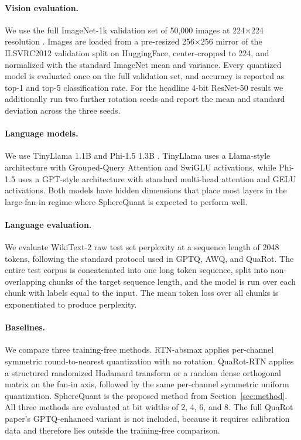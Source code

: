 \paragraph{Vision evaluation.}
We use the full ImageNet-1k validation set of 50,000 images at
224$\times$224 resolution \citep{deng2009imagenet}. Images are loaded
from a pre-resized 256$\times$256 mirror of the ILSVRC2012 validation
split on HuggingFace, center-cropped to 224, and normalized with the
standard ImageNet mean and variance. Every quantized model is evaluated
once on the full validation set, and accuracy is reported as top-1 and
top-5 classification rate. For the headline 4-bit ResNet-50 result we
additionally run two further rotation seeds and report the mean and
standard deviation across the three seeds.

\paragraph{Language models.}
We use TinyLlama 1.1B \citep{tinyllama2024} and Phi-1.5 1.3B
\citep{li2023phi15}. TinyLlama uses a Llama-style architecture with
Grouped-Query Attention and SwiGLU activations, while Phi-1.5 uses a
GPT-style architecture with standard multi-head attention and GELU
activations. Both models have hidden dimensions that place most layers
in the large-fan-in regime where SphereQuant is expected to perform well.

\paragraph{Language evaluation.}
We evaluate WikiText-2 raw test set perplexity
\citep{merity2017wikitext} at a sequence length of 2048 tokens,
following the standard protocol used in GPTQ, AWQ, and QuaRot. The
entire test corpus is concatenated into one long token sequence, split
into non-overlapping chunks of the target sequence length, and the
model is run over each chunk with labels equal to the input. The mean
token loss over all chunks is exponentiated to produce perplexity.

\paragraph{Baselines.}
We compare three training-free methods. RTN-absmax applies per-channel
symmetric round-to-nearest quantization with no rotation. QuaRot-RTN
applies a structured randomized Hadamard transform or a random dense
orthogonal matrix on the fan-in axis, followed by the same
per-channel symmetric uniform quantization. SphereQuant is the proposed method
from Section~\ref{sec:method}. All three methods are evaluated at bit
widths of 2, 4, 6, and 8. The full QuaRot paper's GPTQ-enhanced
variant is not included, because it requires calibration data and
therefore lies outside the training-free comparison.

